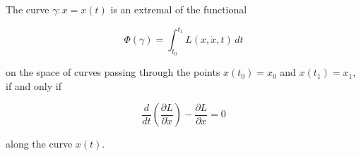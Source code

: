 The curve $\gamma: x = x(t)$ is an extremal of the functional

$$\Phi(\gamma) = \int_{t_0}^{t_1} L(x, \dot{x}, t)\, dt$$

on the space of curves passing through the points $x(t_0) = x_0$ and $x(t_1) = x_1$, if and only if

$$\frac{d}{dt} \left( \frac{\partial L}{\partial \dot{x}} \right) - \frac{\partial L}{\partial x} = 0$$

along the curve $x(t)$.
